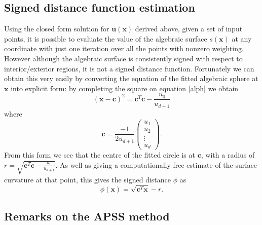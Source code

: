 \documentclass[final,3p,times,twocolumn]{elsarticle}
\begin{document}
\subsection{Signed distance function estimation}
Using the closed form solution for $\textbf{u}(\textbf{x})$ derived above, given a set of input points,
it is possible to evaluate the value of the algebraic surface $s(\textbf{x})$ at any coordinate with just
one iteration over all the points with nonzero weighting. However although the algebraic surface is
consistently signed with respect to interior/exterior regions, it is not a signed distance function. Fortunately we can obtain this very easily by converting the equation of the fitted algebraic sphere at
$\textbf{x}$ into explicit form: by completing the square on equation \ref{alph} we obtain
\begin{equation}
 \left( \textbf{x} - \textbf{c} \right)^2 = \textbf{c}^T\textbf{c} - \frac{u_0}{u_{d+1}}
\end{equation}
where
\begin{equation}
 \textbf{c} = \frac{-1}{2 u_{d+1}} \left( \begin{array}{c}
         u_1 \\
         u_2 \\
         \vdots \\
         u_d
        \end{array} \right) .
\end{equation}
From this form we see that the centre of the fitted circle is at $\textbf{c}$, with a radius
of $r = \sqrt{\textbf{c}^T\textbf{c} - \frac{u_0}{u_{d+1}}}$. As well as giving a computationally-free
estimate of the surface curvature at that point, this gives the signed distance $\phi$ as
\begin{equation}
\phi(\textbf{x}) = \sqrt{\textbf{c}^T \textbf{x}} - r.
\end{equation}


\subsection{Remarks on the APSS method}
\end{document}

